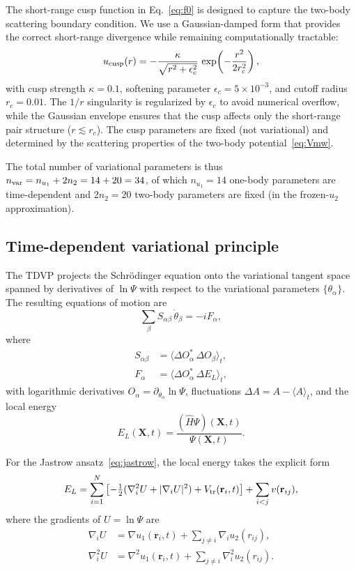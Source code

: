 \documentclass[twocolumn,superscriptaddress,aps,pra,longbibliography]{revtex4-2}
\newcommand{\bx}{\mathbf{X}}
\newcommand{\br}{\mathbf{r}}
\newcommand{\avg}[1]{\langle #1 \rangle}
\begin{document}
The short-range cusp function in Eq.~\eqref{eq:f0} is designed to capture
the two-body scattering boundary condition.  We use a Gaussian-damped
form that provides the correct short-range divergence while remaining
computationally tractable:
\begin{equation}
u_{\rm cusp}(r) = -\frac{\kappa}{\sqrt{r^2 + \epsilon_c^2}}\,
\exp\!\left(-\frac{r^2}{2r_c^2}\right),
\label{eq:cusp}
\end{equation}
with cusp strength $\kappa=0.1$, softening parameter
$\epsilon_c = 5\times 10^{-3}$, and cutoff radius $r_c = 0.01$.
The $1/r$ singularity is regularized by $\epsilon_c$ to avoid
numerical overflow, while the Gaussian envelope ensures that the cusp
affects only the short-range pair structure ($r \lesssim r_c$).  The cusp
parameters are fixed (not variational) and determined by the scattering
properties of the two-body potential~\eqref{eq:Vmw}.

The total number of variational parameters is thus
$n_{\rm var} = n_{u_1} + 2n_2 = 14 + 20 = 34$, of which $n_{u_1}=14$
one-body parameters are time-dependent and $2n_2=20$ two-body parameters
are fixed (in the frozen-$u_2$ approximation).

\subsection{Time-dependent variational principle}
\label{sec:tdvp}

The TDVP projects the Schr\"odinger equation onto the variational tangent
space spanned by derivatives of $\ln\Psi$ with respect to the variational
parameters $\{\theta_\alpha\}$.  The resulting equations of motion
are~\cite{Carleo2012}
\begin{equation}
\sum_\beta S_{\alpha\beta}\,\dot\theta_\beta
= -iF_\alpha,
\label{eq:tdvp_general}
\end{equation}
where
\begin{align}
S_{\alpha\beta} &= \avg{\Delta O_\alpha^* \,\Delta O_\beta}_t,
\label{eq:S_def}
\\
F_\alpha &= \avg{\Delta O_\alpha^* \,\Delta E_L}_t,
\label{eq:F_def}
\end{align}
with logarithmic derivatives
$O_\alpha = \partial_{\theta_\alpha}\ln\Psi$,
fluctuations $\Delta A = A - \avg{A}_t$, and the local energy
\begin{equation}
E_L(\bx,t) = \frac{(\hat{H}\Psi)(\bx,t)}{\Psi(\bx,t)}.
\end{equation}

For the Jastrow ansatz~\eqref{eq:jastrow}, the local energy takes the
explicit form
\begin{equation}
E_L = \sum_{i=1}^N\left[
-\tfrac{1}{2}(\nabla_i^2 U + |\nabla_i U|^2) + V_{\rm tr}(\br_i,t)
\right] + \sum_{i<j} v(\br_{ij}),
\label{eq:EL}
\end{equation}
where the gradients of $U = \ln\Psi$ are
\begin{align}
\nabla_i U &= \nabla u_1(\br_i,t) + \sum_{j\neq i}\nabla_i u_2(r_{ij}),
\\
\nabla_i^2 U &= \nabla^2 u_1(\br_i,t) + \sum_{j\neq i}\nabla_i^2 u_2(r_{ij}).
\end{align}
\end{document}
